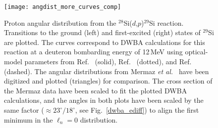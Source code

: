 
\begin{figure}[p]
\texttt{[image: angdist\_more\_curves\_comp]}~
\caption[Proton angular distribution from the $^{28}$Si($d$,$p$)$^{29}$Si reaction]{Proton angular distribution from the $^{28}$Si($d$,$p$)$^{29}$Si reaction.  Transitions to the ground (left) and first-excited (right) states of $^{29}$Si are plotted.  The curves correspond to DWBA calculations for this reaction at a deuteron bombarding
energy of 12\,MeV using optical-model parameters from Ref.~\cite{Mermaz_1971} (solid), Ref.~\cite{ElNaiem_1972} (dotted),  and Ref.~\cite{Piskor_1990} (dashed).  The angular distributions from Mermaz \textit{et al.\ } have been digitized and plotted (triangles) for comparison.  The cross section of the Mermaz data have been scaled to fit the plotted DWBA calculations, and the angles in both plots have been scaled by the same factor ($\approx 23^\circ/18^\circ$, see Fig.~\ref{dwba_ediff}) to align the first minimum in the $\ell_n=0$ distribution.}%
\label{angdist2}%
\end{figure}

